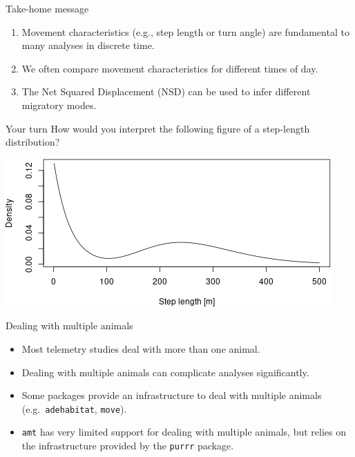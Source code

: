 \documentclass[ignorenonframetext,,t]{beamer}
\providecommand{\tightlist}{%
\setlength{\itemsep}{0pt}\setlength{\parskip}{0pt}}
\providecommand{\tightlist}{%
\setlength{\itemsep}{0pt}\setlength{\parskip}{0pt}}
\renewcommand{\tightlist}{\setlength{\itemsep}{1.4ex}\setlength{\parskip}{0pt}}
\begin{document}
\begin{frame}{Take-home message}
\protect\hypertarget{take-home-message}{}
\begin{enumerate}
\tightlist
\item
  Movement characteristics (e.g., step length or turn angle) are
  fundamental to many analyses in discrete time.
\item
  We often compare movement characteristics for different times of day.
\item
  The Net Squared Displacement (NSD) can be used to infer different
  migratory modes.
\end{enumerate}
\end{frame}

\begin{frame}{Your turn}
\protect\hypertarget{your-turn-2}{}
How would you interpret the following figure of a step-length
distribution?

\begin{center}\includegraphics[width=0.85\linewidth]{01a_lecture_files/figure-beamer/unnamed-chunk-12-1} \end{center}
\end{frame}

\begin{frame}[fragile]{Dealing with multiple animals}
\protect\hypertarget{dealing-with-multiple-animals}{}
\begin{itemize}
\tightlist
\item
  Most telemetry studies deal with more than one animal.
\item
  Dealing with multiple animals can complicate analyses significantly.
\item
  Some packages provide an infrastructure to deal with multiple animals
  (e.g.~\texttt{adehabitat}, \texttt{move}).
\item
  \texttt{amt} has very limited support for dealing with multiple
  animals, but relies on the infrastructure provided by the
  \texttt{purrr} package.
\end{itemize}
\end{frame}
\end{document}
